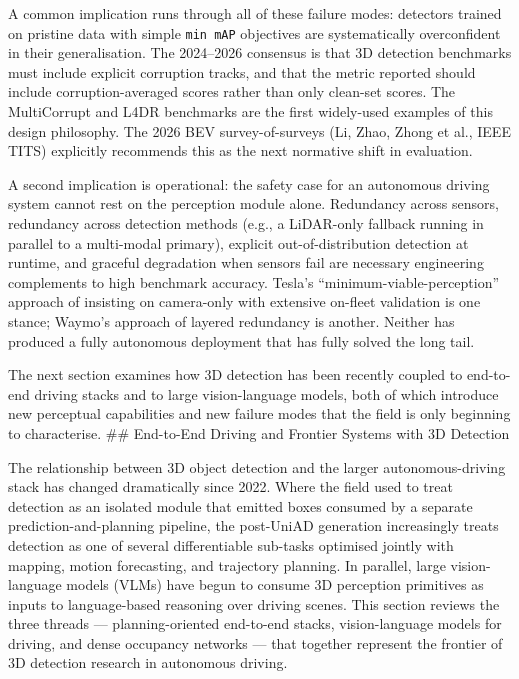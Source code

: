 A common implication runs through all of these failure modes: detectors trained on pristine data with simple \texttt{min\ mAP} objectives are systematically overconfident in their generalisation. The 2024--2026 consensus is that 3D detection benchmarks must include explicit corruption tracks, and that the metric reported should include corruption-averaged scores rather than only clean-set scores. The MultiCorrupt and L4DR benchmarks are the first widely-used examples of this design philosophy. The 2026 BEV survey-of-surveys (Li, Zhao, Zhong et al., IEEE TITS) explicitly recommends this as the next normative shift in evaluation.

A second implication is operational: the safety case for an autonomous driving system cannot rest on the perception module alone. Redundancy across sensors, redundancy across detection methods (e.g., a LiDAR-only fallback running in parallel to a multi-modal primary), explicit out-of-distribution detection at runtime, and graceful degradation when sensors fail are necessary engineering complements to high benchmark accuracy. Tesla's ``minimum-viable-perception'' approach of insisting on camera-only with extensive on-fleet validation is one stance; Waymo's approach of layered redundancy is another. Neither has produced a fully autonomous deployment that has fully solved the long tail.

The next section examines how 3D detection has been recently coupled to end-to-end driving stacks and to large vision-language models, both of which introduce new perceptual capabilities and new failure modes that the field is only beginning to characterise.
\#\# End-to-End Driving and Frontier Systems with 3D Detection

The relationship between 3D object detection and the larger autonomous-driving stack has changed dramatically since 2022. Where the field used to treat detection as an isolated module that emitted boxes consumed by a separate prediction-and-planning pipeline, the post-UniAD generation increasingly treats detection as one of several differentiable sub-tasks optimised jointly with mapping, motion forecasting, and trajectory planning. In parallel, large vision-language models (VLMs) have begun to consume 3D perception primitives as inputs to language-based reasoning over driving scenes. This section reviews the three threads --- planning-oriented end-to-end stacks, vision-language models for driving, and dense occupancy networks --- that together represent the frontier of 3D detection research in autonomous driving.

